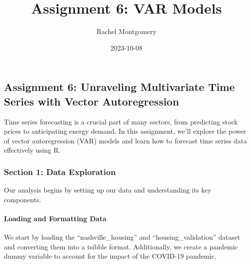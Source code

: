\documentclass[
]{article}
\title{Assignment 6: VAR Models}
\author{Rachel Montgomery}
\date{2023-10-08}
\begin{document}
\maketitle

\hypertarget{assignment-6-unraveling-multivariate-time-series-with-vector-autoregression}{%
\subsection{Assignment 6: Unraveling Multivariate Time Series with
Vector
Autoregression}\label{assignment-6-unraveling-multivariate-time-series-with-vector-autoregression}}

Time series forecasting is a crucial part of many sectors, from
predicting stock prices to anticipating energy demand. In this
assignment, we'll explore the power of vector autoregression (VAR)
models and learn how to forecast time series data effectively using R.

\hypertarget{section-1-data-exploration}{%
\subsubsection{Section 1: Data
Exploration}\label{section-1-data-exploration}}

Our analysis begins by setting up our data and understanding its key
components.

\hypertarget{loading-and-formatting-data}{%
\paragraph{Loading and Formatting
Data}\label{loading-and-formatting-data}}

We start by loading the ``nashville\_housing'' and
``housing\_validation'' dataset and converting them into a tsibble
format. Additionally, we create a pandemic dummy variable to account for
the impact of the COVID-19 pandemic.
\end{document}
